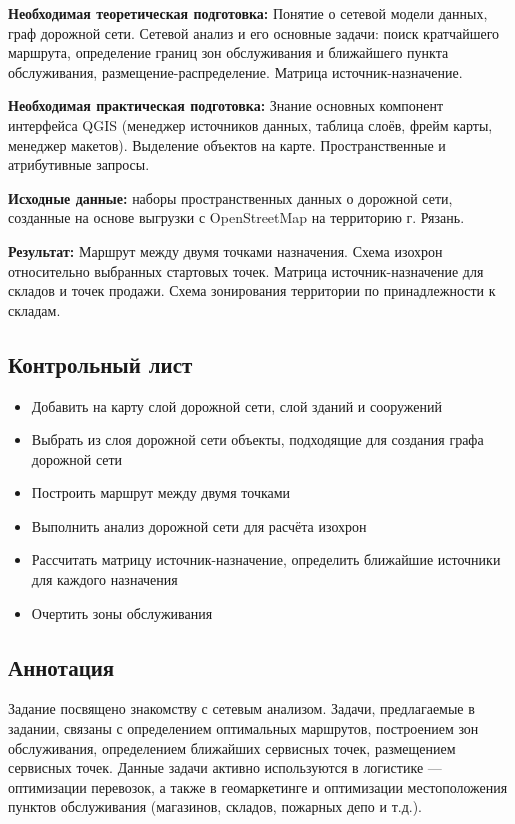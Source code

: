 \documentclass[
  12pt,
]{book}
\providecommand{\tightlist}{%
  \setlength{\itemsep}{0pt}\setlength{\parskip}{0pt}}
\begin{document}
\textbf{Необходимая теоретическая подготовка:} Понятие о сетевой модели данных, граф дорожной сети. Сетевой анализ и его основные задачи: поиск кратчайшего маршрута, определение границ зон обслуживания и ближайшего пункта обслуживания, размещение-распределение. Матрица источник-назначение.

\textbf{Необходимая практическая подготовка:} Знание основных компонент интерфейса QGIS (менеджер источников данных, таблица слоёв, фрейм карты, менеджер макетов). Выделение объектов на карте. Пространственные и атрибутивные запросы.

\textbf{Исходные данные:} наборы пространственных данных о дорожной сети, созданные на основе выгрузки с OpenStreetMap на территорию г. Рязань.

\textbf{Результат:} Маршрут между двумя точками назначения. Схема изохрон относительно выбранных стартовых точек. Матрица источник-назначение для складов и точек продажи. Схема зонирования территории по принадлежности к складам.

\hypertarget{networks-control}{%
\subsection{Контрольный лист}\label{networks-control}}

\begin{itemize}
\tightlist
\item
  Добавить на карту слой дорожной сети, слой зданий и сооружений
\item
  Выбрать из слоя дорожной сети объекты, подходящие для создания графа дорожной сети
\item
  Построить маршрут между двумя точками
\item
  Выполнить анализ дорожной сети для расчёта изохрон
\item
  Рассчитать матрицу источник-назначение, определить ближайшие источники для каждого назначения
\item
  Очертить зоны обслуживания
\end{itemize}

\hypertarget{networks-annotation}{%
\subsection{Аннотация}\label{networks-annotation}}

Задание посвящено знакомству с сетевым анализом. Задачи, предлагаемые в задании, связаны с определением оптимальных маршрутов, построением зон обслуживания, определением ближайших сервисных точек, размещением сервисных точек. Данные задачи активно используются в логистике --- оптимизации перевозок, а также в геомаркетинге и оптимизации местоположения пунктов обслуживания (магазинов, складов, пожарных депо и т.д.).
\end{document}
